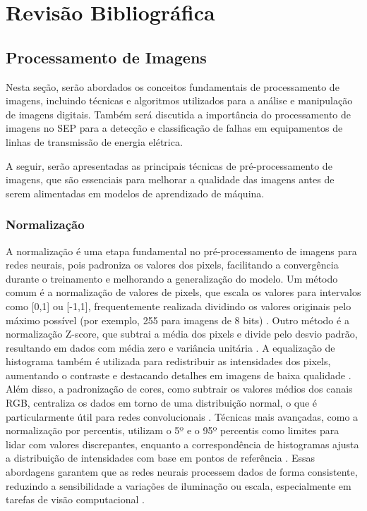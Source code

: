 \chapter{Revisão Bibliográfica}
\section{Processamento de Imagens}
Nesta seção, serão abordados os conceitos fundamentais de processamento de imagens, incluindo técnicas e algoritmos utilizados para a análise e manipulação de imagens digitais. Também será discutida a importância do processamento de imagens no SEP para a detecção e classificação de falhas em equipamentos de linhas de transmissão de energia elétrica.

A seguir, serão apresentadas as principais técnicas de pré-processamento de imagens, que são essenciais para melhorar a qualidade das imagens antes de serem alimentadas em modelos de aprendizado de máquina.

\subsection{Normalização}
A normalização é uma etapa fundamental no pré-processamento de imagens para redes neurais, pois padroniza os valores dos pixels, facilitando a convergência durante o treinamento e melhorando a generalização do modelo. Um método comum é a normalização de valores de pixels, que escala os valores para intervalos como [0,1] ou [-1,1], frequentemente realizada dividindo os valores originais pelo máximo possível (por exemplo, 255 para imagens de 8 bits) \cite{sharma2024deep}. Outro método é a normalização Z-score, que subtrai a média dos pixels e divide pelo desvio padrão, resultando em dados com média zero e variância unitária \cite{chen2023robustness}. A equalização de histograma também é utilizada para redistribuir as intensidades dos pixels, aumentando o contraste e destacando detalhes em imagens de baixa qualidade \cite{chen2023robustness}. Além disso, a padronização de cores, como subtrair os valores médios dos canais RGB, centraliza os dados em torno de uma distribuição normal, o que é particularmente útil para redes convolucionais \cite{sciencedirect2023normalization}. Técnicas mais avançadas, como a normalização por percentis, utilizam o 5º e o 95º percentis como limites para lidar com valores discrepantes, enquanto a correspondência de histogramas ajusta a distribuição de intensidades com base em pontos de referência \cite{isola2023comparison}. Essas abordagens garantem que as redes neurais processem dados de forma consistente, reduzindo a sensibilidade a variações de iluminação ou escala, especialmente em tarefas de visão computacional \cite{sharma2024deep}.

